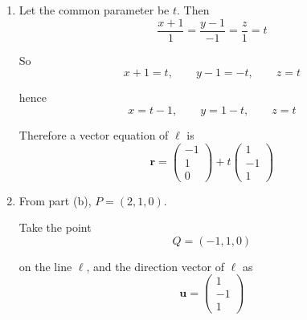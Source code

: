 \documentclass[leqno]{article}
\begin{document}
\begin{enumerate}[
  label=\textbf{\arabic*.},
  leftmargin=*,
  topsep=0pt,
  partopsep=0pt,
  parsep=0pt
]
\begin{djsSolution}
\begin{enumerate}[label=\textbf{(\alph*)}]
Since $\det(\mathbf{A})\neq 0$, the matrix is invertible, so
\[
\mathbf{x}=\mathbf{A}^{-1}\mathbf{b}
\]

Using a calculator to find the inverse:
\[
\mathbf{A}^{-1}=
\begin{pmatrix}
-\frac1{15}&\frac15&\frac13\\[4pt]
\frac25&-\frac15&0\\[4pt]
\frac4{15}&\frac15&-\frac13
\end{pmatrix}
\]

Hence
\begin{align*}
\mathbf{x}
&=
\begin{pmatrix}
-\frac1{15}&\frac15&\frac13\\[4pt]
\frac25&-\frac15&0\\[4pt]
\frac4{15}&\frac15&-\frac13
\end{pmatrix}
\begin{pmatrix}
4\\
3\\
5
\end{pmatrix} 
=
\begin{pmatrix}
2\\
1\\
0
\end{pmatrix}
\end{align*}

So the point of intersection is
\[
P=(2,1,0)
\]

  \item Let the common parameter be $t$. Then
\[
\frac{x+1}{1}=\frac{y-1}{-1}=\frac{z}{1}=t
\]

So
\[
x+1=t,\qquad y-1=-t,\qquad z=t
\]

hence
\[
x=t-1,\qquad y=1-t,\qquad z=t
\]

Therefore a vector equation of $\ell$ is
\[
\mathbf r=
\begin{pmatrix}
-1\\
1\\
0
\end{pmatrix}
+t
\begin{pmatrix}
1\\
-1\\
1
\end{pmatrix}
\]

  \item From part (b), $P=(2,1,0)$.

Take the point
\[
Q=(-1,1,0)
\]

on the line $\ell$, and the direction vector of $\ell$ as
\[
\mathbf u=
\begin{pmatrix}
1\\
-1\\
1
\end{pmatrix}
\]


\end{enumerate}
\end{djsSolution}
\end{enumerate}
\end{document}
